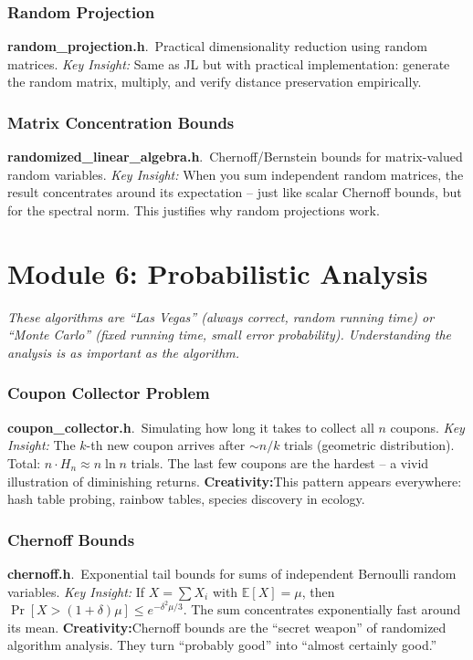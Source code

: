 \documentclass[11pt,a4paper]{article}
\newcommand{\algo}[2]{\textbf{#1}.\ #2}
\newcommand{\insight}{\textit{Key Insight: }}
\newcommand{\creative}{\textcolor{orange!80!black}{\textbf{Creativity:}}}
\begin{document}
\subsubsection{Random Projection}
\algo{random\_projection.h}{Practical dimensionality reduction using random matrices.}
\insight Same as JL but with practical implementation: generate the random matrix, multiply, and verify distance preservation empirically.

\subsubsection{Matrix Concentration Bounds}
\algo{randomized\_linear\_algebra.h}{Chernoff/Bernstein bounds for matrix-valued random variables.}
\insight When you sum independent random matrices, the result concentrates around its expectation -- just like scalar Chernoff bounds, but for the spectral norm. This justifies why random projections work.

\section{Module 6: Probabilistic Analysis}
\label{sec:prob}

\textit{These algorithms are ``Las Vegas'' (always correct, random running time) or ``Monte Carlo'' (fixed running time, small error probability). Understanding the analysis is as important as the algorithm.}

\subsubsection{Coupon Collector Problem}
\algo{coupon\_collector.h}{Simulating how long it takes to collect all \(n\) coupons.}
\insight The \(k\)-th new coupon arrives after \(\sim n/k\) trials (geometric distribution). Total: \(n \cdot H_n \approx n \ln n\) trials. The last few coupons are the hardest -- a vivid illustration of diminishing returns.
\creative This pattern appears everywhere: hash table probing, rainbow tables, species discovery in ecology.

\subsubsection{Chernoff Bounds}
\algo{chernoff.h}{Exponential tail bounds for sums of independent Bernoulli random variables.}
\insight If \(X = \sum X_i\) with \(\mathbb{E}[X] = \mu\), then \(\Pr[X > (1+\delta)\mu] \le e^{-\delta^2 \mu / 3}\). The sum concentrates exponentially fast around its mean.
\creative Chernoff bounds are the ``secret weapon'' of randomized algorithm analysis. They turn ``probably good'' into ``almost certainly good.''
\end{document}
